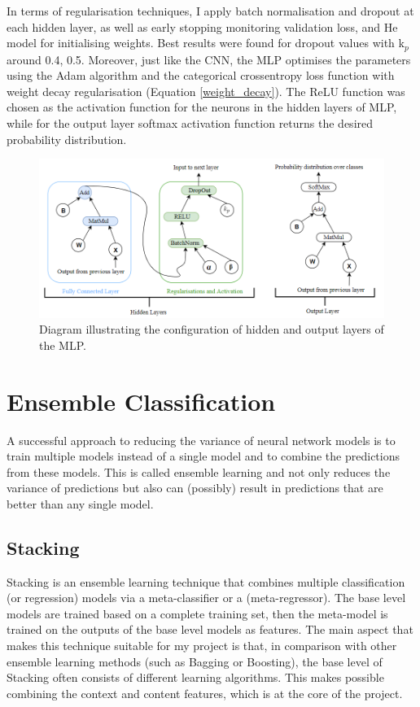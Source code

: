 In terms of regularisation techniques, I apply batch normalisation and dropout at each hidden layer, as well as early stopping monitoring validation loss, and He model for initialising weights. Best results were found for dropout values with k$_p$ around 0.4, 0.5. Moreover, just like the CNN, the MLP optimises the parameters using the Adam algorithm and the categorical crossentropy loss function with weight decay regularisation (Equation \ref{weight_decay}). The ReLU function was chosen as the activation function for the neurons in the hidden layers of MLP, while for the output layer softmax activation function returns the desired probability distribution. 

\begin{figure}[H]
  \centering
  \centerline{\includegraphics[scale=0.6]{Images/mlp_layers.png}}
  \caption{Diagram illustrating the configuration of hidden and output layers of the MLP.}
  \label{mlp_layers}
\end{figure}


\section{Ensemble Classification}

A successful approach to reducing the variance of neural network models is to train multiple models instead of a single model and to combine the predictions from these models. This is called ensemble learning and not only reduces the variance of predictions but also can (possibly) result in predictions that are better than any single model. \\

\subsection{Stacking}

Stacking is an ensemble learning technique that combines multiple classification (or regression) models via a meta-classifier or a (meta-regressor). The base level models are trained based on a complete training set, then the meta-model is trained on the outputs of the base level models as features. The main aspect that makes this technique suitable for my project is that, in comparison with other ensemble learning methods (such as Bagging or Boosting), the base level of Stacking often consists of different learning algorithms. This makes possible combining the context and content features, which is at the core of the project.\\

